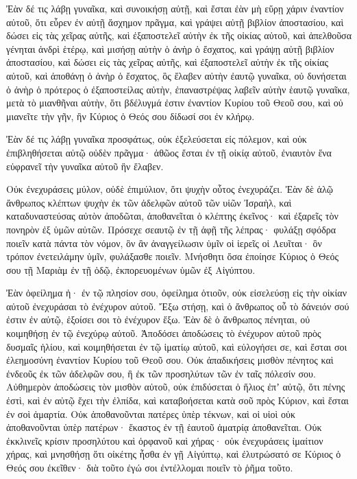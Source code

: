 {Ἐὰν δέ τις λάβῃ γυναῖκα, καὶ συνοικήσῃ αὐτῇ, καὶ ἔσται ἐὰν μὴ εὕρῃ χάριν ἐναντίον αὐτοῦ, ὅτι εὗρεν ἐν αὐτῇ ἄσχημον πρᾶγμα, καὶ γράψει αὐτῇ βιβλίον ἀποστασίου, καὶ δώσει εἰς τὰς χεῖρας αὐτῆς, καὶ ἐξαποστελεῖ αὐτὴν ἐκ τῆς οἰκίας αὐτοῦ,
καὶ ἀπελθοῦσα γένηται ἀνδρὶ ἑτέρῳ,
καὶ μισήσῃ αὐτὴν ὁ ἀνὴρ ὁ ἔσχατος, καὶ γράψῃ αὐτῇ βιβλίον ἀποστασίου, καὶ δώσει εἰς τὰς χεῖρας αὐτῆς, καὶ ἐξαποστελεῖ αὐτὴν ἐκ τῆς οἰκίας αὐτοῦ, καὶ ἀποθάνῃ ὁ ἀνὴρ ὁ ἔσχατος, ὃς ἔλαβεν αὐτὴν ἐαυτῷ γυναῖκα,
οὐ δυνήσεται ὁ ἀνὴρ ὁ πρότερος ὁ ἐξαποστείλας αὐτὴν, ἐπαναστρέψας λαβεῖν αὐτὴν ἑαυτῷ γυναῖκα, μετὰ τὸ μιανθῆναι αὐτὴν, ὅτι βδέλυγμά ἐστιν ἐναντίον Κυρίου τοῦ Θεοῦ σου, καὶ οὐ μιανεῖτε τὴν γῆν, ἣν Κύριος ὁ Θεός σου δίδωσί σοι ἐν κλήρῳ.
\par }{\PP {}Ἐὰν δέ τις λάβῃ γυναῖκα προσφάτως, οὐκ ἐξελεύσεται εἰς πόλεμον, καὶ οὐκ ἐπιβληθήσεται αὐτῷ οὐδὲν πρᾶγμα· ἀθῶος ἔσται ἐν τῇ οἰκίᾳ αὐτοῦ, ἐνιαυτὸν ἕνα εὐφρανεῖ τὴν γυναῖκα αὐτοῦ ἣν ἔλαβεν.
\par }{\PP {}Οὐκ ἐνεχυράσεις μύλον, οὐδὲ ἐπιμύλιον, ὅτι ψυχὴν οὗτος ἐνεχυράζει.
Ἐὰν δὲ ἁλῷ ἄνθρωπος κλέπτων ψυχὴν ἐκ τῶν ἀδελφῶν αὐτοῦ τῶν υἱῶν Ἰσραὴλ, καὶ καταδυναστεύσας αὐτὸν ἀποδῶται, ἀποθανεῖται ὁ κλέπτης ἐκεῖνος· καὶ ἐξαρεῖς τὸν πονηρὸν ἐξ ὑμῶν αὐτῶν.
Πρόσεχε σεαυτῷ ἐν τῇ ἁφῇ τῆς λέπρας· φυλάξῃ σφόδρα ποιεῖν κατὰ πάντα τὸν νόμον, ὃν ἂν ἀναγγείλωσιν ὑμῖν οἱ ἱερεῖς οἱ Λευῖται· ὃν τρόπον ἐνετειλάμην ὑμῖν, φυλάξασθε ποιεῖν.
Μνήσθητι ὅσα ἐποίησε Κύριος ὁ Θεός σου τῇ Μαριὰμ ἐν τῇ ὁδῷ, ἐκπορευομένων ὑμῶν ἐξ Αἰγύπτου.
\par }{\PP {}Ἐὰν ὀφείλημα ἠ· ἐν τῷ πλησίον σου, ὀφείλημα ὁτιοῦν, οὐκ εἰσελεύσῃ εἰς τὴν οἰκίαν αὐτοῦ ἐνεχυράσαι τὸ ἐνέχυρον αὐτοῦ.
Ἔξω στήσῃ, καὶ ὁ ἄνθρωπος οὗ τὸ δάνειόν σού ἐστιν ἐν αὐτῷ, ἐξοίσει σοι τὸ ἐνέχυρον ἔξω.
Ἐὰν δὲ ὁ ἄνθρωπος πένηται, οὐ κοιμηθήσῃ ἐν τῷ ἐνεχύρῳ αὐτοῦ.
Ἀποδόσει ἀποδώσεις τὸ ἐνέχυρον αὐτοῦ πρὸς δυσμαῖς ἡλίου, καὶ κοιμηθήσεται ἐν τῷ ἱματίῳ αὐτοῦ, καὶ εὐλογήσει σε, καὶ ἔσται σοι ἐλεημοσύνη ἐναντίον Κυρίου τοῦ Θεοῦ σου.
Οὐκ ἀπαδικήσεις μισθὸν πένητος καὶ ἐνδεοῦς ἐκ τῶν ἀδελφῶν σου, ἢ ἐκ τῶν προσηλύτων τῶν ἐν ταῖς πόλεσίν σου.
Αὐθημερὸν ἀποδώσεις τὸν μισθὸν αὐτοῦ, οὐκ ἐπιδύσεται ὁ ἥλιος ἐπʼ αὐτῷ, ὅτι πένης ἐστὶ, καὶ ἐν αὐτῷ ἔχει τὴν ἐλπίδα, καὶ καταβοήσεται κατὰ σοῦ πρὸς Κύριον, καὶ ἔσται ἐν σοὶ ἁμαρτία.
Οὐκ ἀποθανοῦνται πατέρες ὑπὲρ τέκνων, καὶ οἱ υἱοὶ οὐκ ἀποθανοῦνται ὑπὲρ πατέρων· ἕκαστος ἐν τῇ ἑαυτοῦ ἁματρίᾳ ἀποθανεῖται.
Οὐκ ἐκκλινεῖς κρίσιν προσηλύτου καὶ ὀρφανοῦ καὶ χήρας·
οὐκ ἐνεχυράσεις ἱμαίτιον χήρας, καὶ μνησθήσῃ ὅτι οἰκέτης ἦσθα ἐν γῇ Αἰγύπτῳ, καὶ ἐλυτρώσατό σε Κύριος ὁ Θεός σου ἐκεῖθεν· διὰ τοῦτο ἐγώ σοι ἐντέλλομαι ποιεῖν τὸ ῥῆμα τοῦτο.
}

